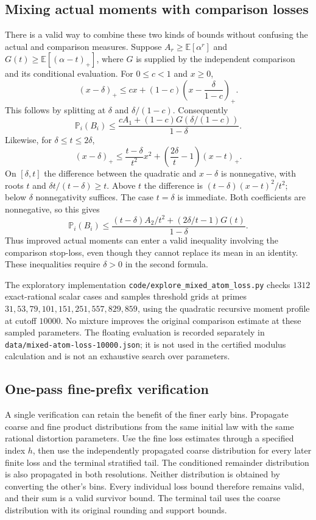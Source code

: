 \documentclass[11pt]{article}
\newcommand{\E}{\mathbb E}
\newcommand{\Pp}{\mathbb P}
\begin{document}
\subsection{Mixing actual moments with comparison losses}
There is a valid way to combine these two kinds of bounds without confusing
the actual and comparison measures. Suppose $A_r\geq\E[\alpha^r]$ and
$G(t)\geq\E[(\alpha-t)_+]$, where $G$ is supplied by the independent
comparison and its conditional evaluation. For $0\leq c<1$ and $x\geq0$,
\[
 (x-\delta)_+\leq c x+(1-c)
                \left(x-\frac{\delta}{1-c}\right)_+.
\]
This follows by splitting at $\delta$ and $\delta/(1-c)$. Consequently
\[
 \Pp_i(B_i)\leq
 \frac{c A_1+(1-c)G(\delta/(1-c))}{1-\delta}.
\]
Likewise, for $\delta\leq t\leq2\delta$,
\[
 (x-\delta)_+\leq\frac{t-\delta}{t^2}x^2+
                   \left(\frac{2\delta}{t}-1\right)(x-t)_+.
\]
On $[\delta,t]$ the difference between the quadratic and $x-\delta$
is nonnegative, with roots $t$ and $\delta t/(t-\delta)\geq t$.
Above $t$ the difference is $(t-\delta)(x-t)^2/t^2$; below $\delta$
nonnegativity suffices. The case $t=\delta$ is immediate.
Both coefficients are nonnegative, so this gives
\[
 \Pp_i(B_i)\leq\frac{(t-\delta)A_2/t^2+
                      (2\delta/t-1)G(t)}{1-\delta}.
\]
Thus improved actual moments can enter a valid inequality involving the
comparison stop-loss, even though they cannot replace its mean in an
identity. These inequalities require $\delta>0$ in the second formula.

The exploratory implementation \texttt{code/explore\_mixed\_atom\_loss.py}
checks $1312$ exact-rational scalar cases and samples threshold grids at
primes $31,53,79,101,151,251,557,829,859$, using the quadratic recursive
moment profile at cutoff $10000$. No mixture improves the original
comparison estimate at these sampled parameters. The floating evaluation
is recorded separately in \texttt{data/mixed-atom-loss-10000.json}; it is
not used in the certified modulus calculation and is not an exhaustive
search over parameters.

\subsection{One-pass fine-prefix verification}
A single verification can retain the benefit of the finer early bins.
Propagate coarse and fine product distributions from the same initial law
with the same rational distortion parameters. Use the fine loss estimates
through a specified index $h$, then use the independently propagated coarse
distribution for every later finite loss and the terminal stratified tail.
The conditioned remainder distribution is also propagated in both
resolutions. Neither distribution is obtained by converting the other's
bins. Every individual loss bound therefore remains valid, and their sum
is a valid survivor bound. The terminal tail uses the coarse distribution
with its original rounding and support bounds.
\end{document}
